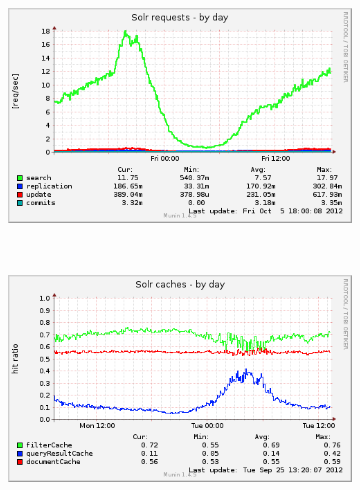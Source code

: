 \documentclass[10pt,a4paper]{article}
\begin{document}
\begin{figure}
        \centering
        \begin{subfigure}[b]{0.45\textwidth}
                \centering
                \includegraphics[width=\textwidth]{solr_users_reqs-day}
                \label{fig:solr_users_reqs-day}
        \end{subfigure}%
        ~ %
        \begin{subfigure}[b]{0.45\textwidth}
                \centering
                \includegraphics[width=\textwidth]{solr_users_cache-day}
                \label{fig:solr_users_cache-day}
        \end{subfigure}
                

\end{figure}
\end{document}
